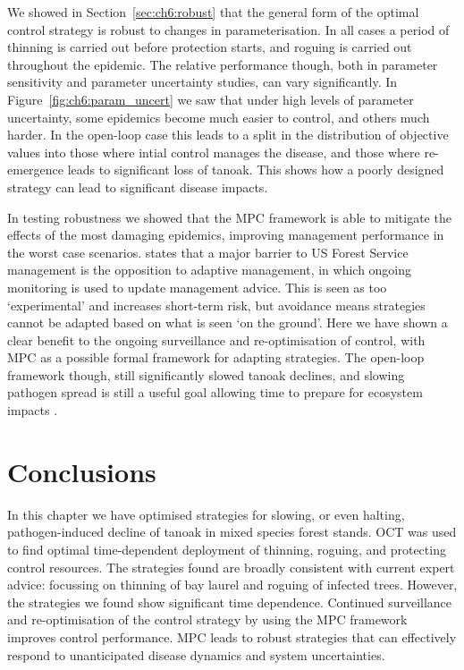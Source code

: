 We showed in Section~\ref{sec:ch6:robust} that the general form of the optimal control strategy is robust to changes in parameterisation. In all cases a period of thinning is carried out before protection starts, and roguing is carried out throughout the epidemic. The relative performance though, both in parameter sensitivity and parameter uncertainty studies, can vary significantly. In Figure~\ref{fig:ch6:param_uncert} we saw that under high levels of parameter uncertainty, some epidemics become much easier to control, and others much harder. In the open-loop case this leads to a split in the distribution of objective values into those where intial control manages the disease, and those where re-emergence leads to significant loss of tanoak. This shows how a poorly designed strategy can lead to significant disease impacts.

In testing robustness we showed that the MPC framework is able to mitigate the effects of the most damaging epidemics, improving management performance in the worst case scenarios. \citet{maccleery_reinventing_2015} states that a major barrier to US Forest Service management is the opposition to adaptive management, in which ongoing monitoring is used to update management advice. This is seen as too `experimental' and increases short-term risk, but avoidance means strategies cannot be adapted based on what is seen `on the ground'. Here we have shown a clear benefit to the ongoing surveillance and re-optimisation of control, with MPC as a possible formal framework for adapting strategies. The open-loop framework though, still significantly slowed tanoak declines, and slowing pathogen spread is still a useful goal allowing time to prepare for ecosystem impacts \citep{cobb_biodiversity_2013}.

\section{Conclusions\label{sec:ch6:conclusions}}

In this chapter we have optimised strategies for slowing, or even halting, pathogen-induced decline of tanoak in mixed species forest stands. OCT was used to find optimal time-dependent deployment of thinning, roguing, and protecting control resources. The strategies found are broadly consistent with current expert advice: focussing on thinning of bay laurel and roguing of infected trees. However, the strategies we found show significant time dependence. Continued surveillance and re-optimisation of the control strategy by using the MPC framework improves control performance. MPC leads to robust strategies that can effectively respond to unanticipated disease dynamics and system uncertainties.
